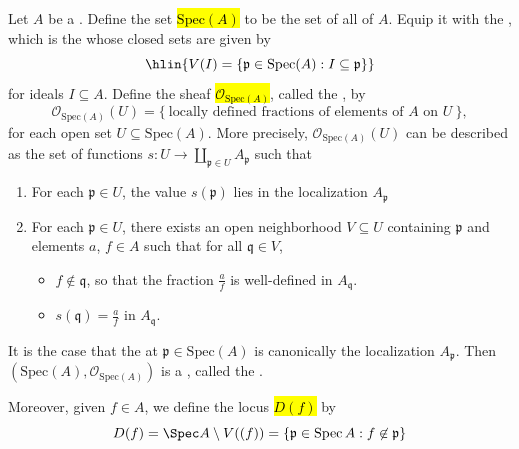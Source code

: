 \begin{definition} \label{definition:affine_scheme}
Let $A$ be a . Define the set \hl{$\mathrm{Spec}(A)$}
to be the set of all  of $A$. Equip it with the , which is the  whose closed sets are given by 
$$\hlin{V(I) = \{\mathfrak{p} \in \mathrm{Spec}(A) : I \subseteq \mathfrak{p}\}}$$
for ideals $I \subseteq A$.  
Define the sheaf \hl{$\mathcal{O}_{\mathrm{Spec}(A)}$}, called the , by 
$$\mathcal{O}_{\mathrm{Spec}(A)}(U) = \{ \ \text{locally defined fractions of elements of $A$ on $U$} \ \},$$
for each open set $U \subseteq \mathrm{Spec}(A)$. More precisely, $\mathcal{O}_{\mathrm{Spec}(A)}(U)$ can be described as the set of functions $s: U \to \coprod_{\mathfrak{p} \in U} A_\mathfrak{p}$  such that  
\begin{enumerate}
    \item For each $\mathfrak{p} \in U$, the value $s(\mathfrak{p})$ lies in the localization $A_\mathfrak{p}$
    \item For each $\mathfrak{p} \in U$, there exists an open neighborhood $V \subseteq U$ containing $\mathfrak{p}$ and elements $a$, $f \in A$ such that for all $\mathfrak{q} \in V$, 
    \begin{itemize}
        \item $f \not \in \mathfrak{q}$, so that the fraction $\frac{a}{f}$ is well-defined in $A_\mathfrak{q}$.
        \item $s(\mathfrak{q}) = \frac{a}{f}$ in $A_\mathfrak{q}$. 
    \end{itemize}
\end{enumerate}

It is the case that the  at $\mathfrak{p} \in \mathrm{Spec}(A)$ is canonically the localization $A_{\mathfrak{p}}$.  
Then $(\mathrm{Spec}(A), \mathcal{O}_{\mathrm{Spec}(A)})$ is a , called the .

Moreover, given $f \in A$, we define the locus \hl{$D(f)$} by 
$$D(f) = \Spec A \setminus V((f)) = \{ \mathfrak{p} \in \operatorname{Spec} A : f \not\in \mathfrak{p} \}$$
\end{definition}
